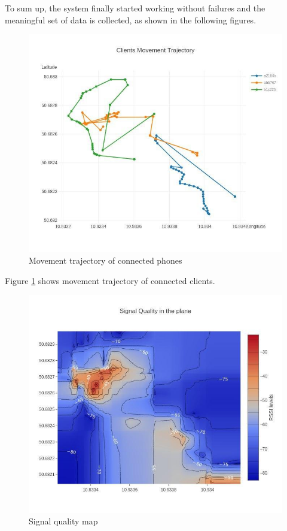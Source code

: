 To sum up, the system finally started working without failures and the meaningful set of data is collected, as shown in the following figures.



\begin{figure}[H]
	\centering
	\includegraphics[width=\linewidth,keepaspectratio]{images/experiment_3_1.jpg}
	\caption{Movement trajectory of connected phones}
	\label{fig:movement-trajectory}
\end{figure}

Figure \ref{fig:movement-trajectory} shows movement trajectory of connected clients. 

\begin{figure}[H]
	\centering
	\includegraphics[width=\linewidth,keepaspectratio]{images/experiment_3_2.jpg}
	\caption{Signal quality map}
	\label{fig:signal-quality-heatmap}
\end{figure}

